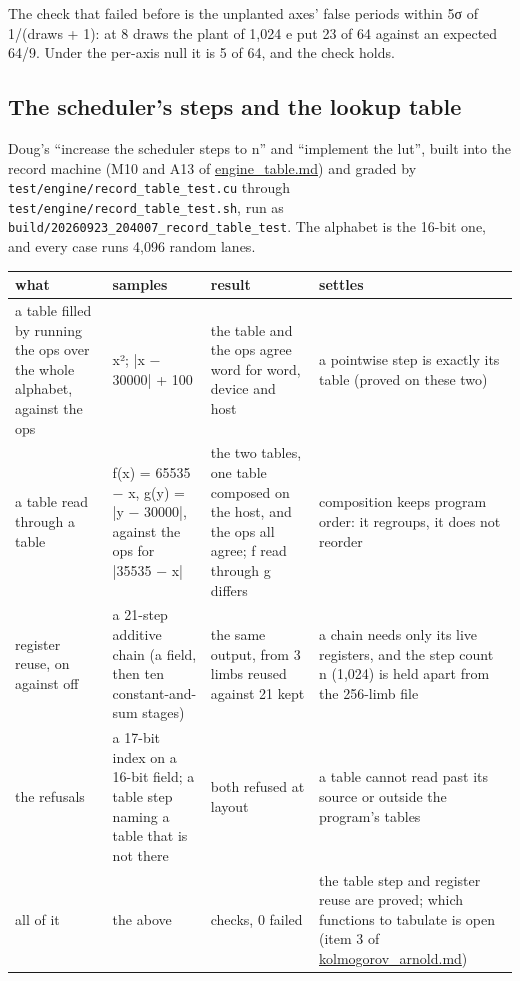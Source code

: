 The check that failed before is the unplanted axes' false periods within 5σ of 1/(draws + 1): at 8 draws the plant of 1,024 e put 23 of 64 against an expected 64/9. Under the per-axis null it is 5 of 64, and the check holds.

\subsection{\texorpdfstring{The scheduler's steps and the lookup table}{The scheduler's steps and the lookup table}}

Doug's “increase the scheduler steps to n” and “implement the lut”, built into the record machine (M10 and A13 of \hyperref[chap:engine-table]{engine\_\allowbreak{}table.md}) and graded by \texttt{test/\allowbreak{}engine/\allowbreak{}record\_\allowbreak{}table\_\allowbreak{}test.\allowbreak{}cu} through \texttt{test/\allowbreak{}engine/\allowbreak{}record\_\allowbreak{}table\_\allowbreak{}test.\allowbreak{}sh}, run as \texttt{build/\allowbreak{}20260923\_\allowbreak{}204007\_\allowbreak{}record\_\allowbreak{}table\_\allowbreak{}test}. The alphabet is the 16-bit one, and every case runs 4,096 random lanes.

{\footnotesize
\setlength{\tabcolsep}{6pt}
\begin{longtable}{>{\RaggedRight\arraybackslash}p{}>{\RaggedRight\arraybackslash}p{}>{\RaggedRight\arraybackslash}p{}>{\RaggedRight\arraybackslash}p{}}
\toprule
what & samples & result & settles \\
\midrule
\endhead
a table filled by running the ops over the whole alphabet, against the ops & x²; |x − 30000| + 100 & the table and the ops agree word for word, device and host & a pointwise step is exactly its table (proved on these two) \\
a table read through a table & f(x) = 65535 − x, g(y) = |y − 30000|, against the ops for |35535 − x| & the two tables, one table composed on the host, and the ops all agree; f read through g differs & composition keeps program order: it regroups, it does not reorder \\
register reuse, on against off & a 21-step additive chain (a field, then ten constant-and-sum stages) & the same output, from 3 limbs reused against 21 kept & a chain needs only its live registers, and the step count n (1,024) is held apart from the 256-limb file \\
the refusals & a 17-bit index on a 16-bit field; a table step naming a table that is not there & both refused at layout & a table cannot read past its source or outside the program's tables \\
all of it & the above & 15 checks, 0 failed & the table step and register reuse are proved; which functions to tabulate is open (item 3 of \hyperref[chap:kolmogorov-arnold]{kolmogorov\_\allowbreak{}arnold.md}) \\
\bottomrule
\end{longtable}
}

